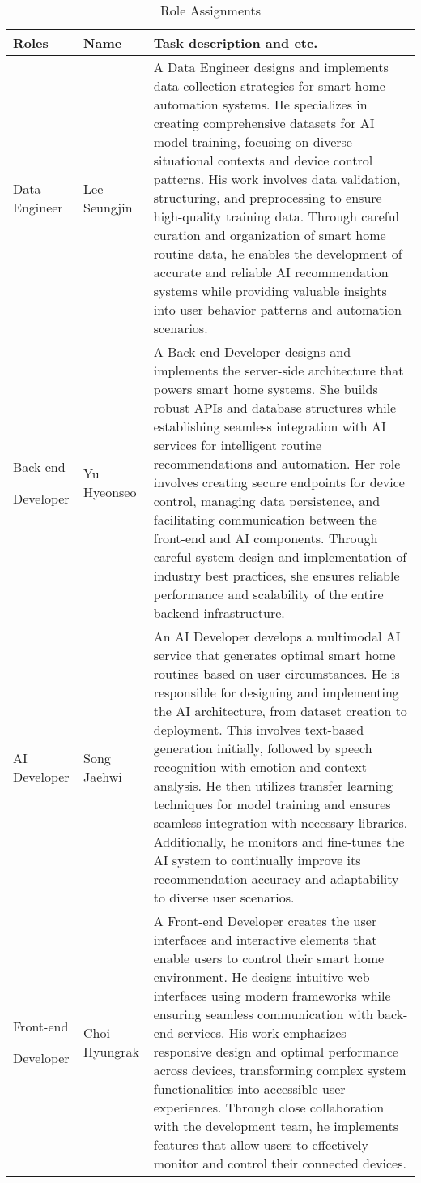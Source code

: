 \documentclass[conference]{IEEEtran}
\begin{document}
\begin{table}[ht]
\centering
\caption{Role Assignments}
\resizebox{0.49\textwidth}{!}
{
\begin{tabular}{p{2cm}p{2cm}p{5.3cm}} 
\toprule
\textbf{Roles} & \textbf{Name} & \textbf{Task description and etc.} \\
\midrule
Data Engineer & Lee Seungjin & A Data Engineer designs and implements data collection strategies for smart home automation systems. He specializes in creating comprehensive datasets for AI model training, focusing on diverse situational contexts and device control patterns. His work involves data validation, structuring, and preprocessing to ensure high-quality training data. Through careful curation and organization of smart home routine data, he enables the development of accurate and reliable AI recommendation systems while providing valuable insights into user behavior patterns and automation scenarios. \\
\addlinespace[1.5em]
Back-end\par Developer & Yu Hyeonseo & A Back-end Developer designs and implements the server-side architecture that powers smart home systems. She builds robust APIs and database structures while establishing seamless integration with AI services for intelligent routine recommendations and automation. Her role involves creating secure endpoints for device control, managing data persistence, and facilitating communication between the front-end and AI components. Through careful system design and implementation of industry best practices, she ensures reliable performance and scalability of the entire backend infrastructure. \\
\addlinespace[1.5em]
AI Developer & Song Jaehwi & An AI Developer develops a multimodal AI service that generates optimal smart home routines based on user circumstances. He is responsible for designing and implementing the AI architecture, from dataset creation to deployment. This involves text-based generation initially, followed by speech recognition with emotion and context analysis. He then utilizes transfer learning techniques for model training and ensures seamless integration with necessary libraries. Additionally, he monitors and fine-tunes the AI system to continually improve its recommendation accuracy and adaptability to diverse user scenarios. \\
\addlinespace[1.5em]
Front-end\par Developer & Choi Hyungrak & A Front-end Developer creates the user interfaces and interactive elements that enable users to control their smart home environment. He designs intuitive web interfaces using modern frameworks while ensuring seamless communication with back-end services. His work emphasizes responsive design and optimal performance across devices, transforming complex system functionalities into accessible user experiences. Through close collaboration with the development team, he implements features that allow users to effectively monitor and control their connected devices. \\
\bottomrule
\end{tabular}
}
\end{table}
\end{document}

